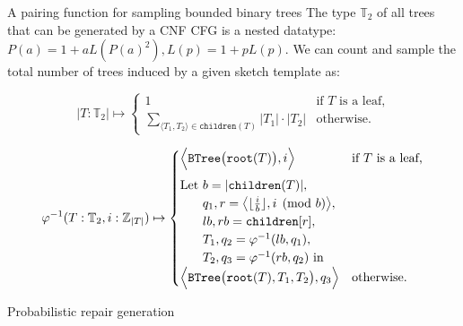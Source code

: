 \documentclass{beamer}
\begin{document}
\begin{frame}[fragile]{A pairing function for sampling bounded binary trees}
The type $\mathbb{T}_2$ of all trees that can be generated by a CNF CFG is a nested datatype: $P(a) = 1 + a L(P(a)^2), L(p) = 1 + p L(p)$. We can count and sample the total number of trees induced by a given sketch template as:

\begin{equation*}
  |T: \mathbb{T}_2| \mapsto \begin{cases}
    1  & \text{if $T$ is a leaf,} \\
    \sum_{\langle T_1, T_2\rangle \in \texttt{children}(T)} |T_1| \cdot |T_2| & \text{otherwise.}
  \end{cases}
\end{equation*}

\begin{equation*}
  \varphi^{-1}(T: \mathbb{T}_2, i: \mathbb{Z}_{|T|}) \mapsto \begin{cases}
  \Big\langle\texttt{BTree}\big(\texttt{root}(T)\big), i\Big\rangle & \text{if $T$ is a leaf,} \vspace{5pt}\\
  \text{Let } b = |\texttt{children}(T)|,\\
  \phantom{\text{Let }} q_1, r=\big\langle\lfloor\frac{i}{b}\rfloor, i \pmod{b}\big\rangle,\\
  \phantom{\text{Let }} lb, rb = \texttt{children}[r],\\
  \phantom{\text{Let }} T_1, q_2 = \varphi^{-1}(lb, q_1),\\
  \phantom{\text{Let }} T_2, q_3 = \varphi^{-1}(rb, q_2) \text{ in } \\
  \Big\langle\texttt{BTree}\big(\texttt{root}(T), T_1, T_2\big), q_3\Big\rangle & \text{otherwise.} \\
  \end{cases}
\end{equation*}
\end{frame}

\begin{frame}[fragile]{Probabilistic repair generation}
\end{frame}
\end{document}
